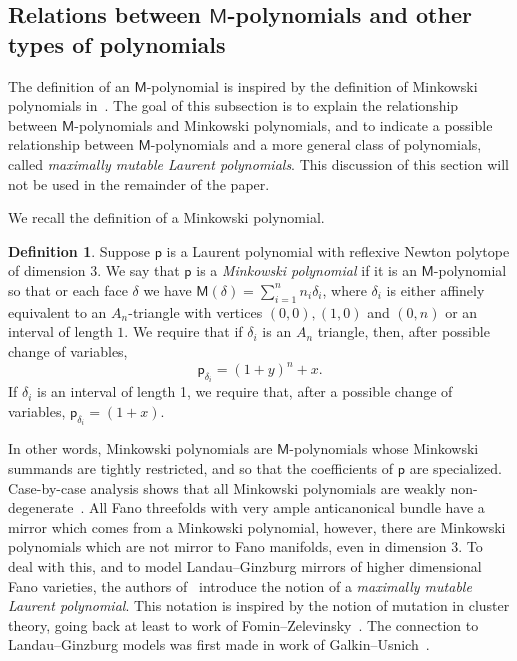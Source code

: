 \documentclass[10pt]{amsart}
\numberwithin{equation}{section}
\theoremstyle{plain}
\theoremstyle{definition}
\newtheorem{definition}[theorem]{Definition}
\theoremstyle{remark}
\begin{document}
\subsection{Relations between \texorpdfstring{\(\mathsf{M}\)}{M}-polynomials and other types of polynomials}\label{subsection:minkowski}

The definition of an \(\mathsf{M}\)-polynomial is inspired by the definition of Minkowski polynomials in~\cite{coates2014mirror}. The goal of this subsection is to explain the relationship between \(\mathsf{M}\)-polynomials and Minkowski polynomials, and to indicate a possible relationship between \(\mathsf{M}\)-polynomials and a more general class of polynomials, called \emph{maximally mutable Laurent polynomials}. This discussion of this section will not be used in the remainder of the paper.


We recall the definition of a Minkowski polynomial.

\begin{definition}\label{definition:Mink}
  Suppose \(\mathsf{p}\) is a Laurent polynomial  with reflexive Newton polytope of dimension \(3\). We say that \(\mathsf{p}\) is a \emph{Minkowski polynomial} if it is an \(\mathsf{M}\)-polynomial so that or each face \(\delta\) we have \(\mathsf{M}(\delta) = \sum_{i=1}^n n_i \delta_i\), where \(\delta_i\) is either affinely equivalent to an \(A_n\)-triangle with vertices \((0,0),(1,0)\) and \((0,n)\) or an interval of length \(1\). We require that if \(\delta_i\) is an \(A_n\) triangle, then, after possible change of variables,
  \[
    \mathsf{p}_{\delta_i} = (1+y)^n + x.
  \]
  If \(\delta_i\) is an interval of length 1, we require that, after a possible change of variables, \(\mathsf{p}_{\delta_i} = (1 + x)\).
\end{definition}

\noindent In other words, Minkowski polynomials are \(\mathsf{M}\)-polynomials whose Minkowski summands are tightly restricted, and so that the coefficients of \(\mathsf{p}\) are specialized. Case-by-case analysis shows that all Minkowski polynomials are weakly non-degenerate~\cite{przyjalkowski2017compactification}. All Fano threefolds with very ample anticanonical bundle have a mirror which comes from a Minkowski polynomial, however, there are Minkowski polynomials which are not mirror to Fano manifolds, even in dimension \(3\). To deal with this, and to model Landau--Ginzburg mirrors of higher dimensional Fano varieties, the authors of~\cite{coates2021maximally} introduce the notion of a \emph{maximally mutable Laurent polynomial}. This notation is inspired by the notion of mutation in cluster theory, going back at least to work of Fomin--Zelevinsky~\cite{fomin2002cluster}. The connection to Landau--Ginzburg models was first made in work of Galkin--Usnich~\cite{galkin2010mutations}.
\end{document}
